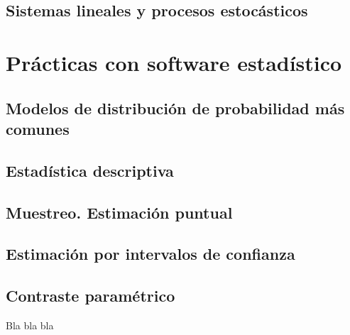 \documentclass[a4paper]{book}
\begin{document}
\section{Sistemas lineales y procesos estocásticos}

\chapter{Prácticas con software estadístico}


\section{Modelos de distribución de probabilidad más comunes}

\section{Estadística descriptiva}

\section{Muestreo. Estimación puntual}

\section{Estimación por intervalos de confianza}

\section{Contraste paramétrico}
Bla bla bla



%
%
\end{document}
